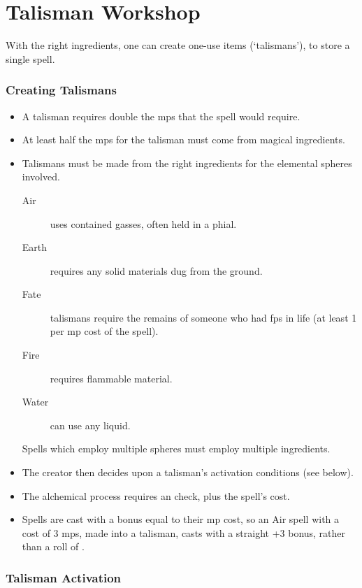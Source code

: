 \section{Talisman Workshop}

\begin{multicols}{2}

\noindent
With the right ingredients, one can create one-use items (`talismans'), to store a single spell.

\subsubsection{Creating Talismans}

\begin{itemize}
  \item
  A talisman requires double the \glspl{mp} that the spell would require.
  \item
  At least half the \glspl{mp} for the talisman must come from magical ingredients.
  \item
  Talismans must be made from the right ingredients for the elemental spheres involved.
  \begin{description}
    \item[Air]
    uses contained gasses, often held in a phial.
    \item[Earth]
    requires any solid materials dug from the ground.
    \item[Fate]
    talismans require the remains of someone who had \glspl{fp} in life (at least 1 per \gls{mp} cost of the spell).
    \item[Fire]
    requires flammable material.
    \item[Water]
    can use any liquid.
  \end{description}
  Spells which employ multiple spheres must employ multiple ingredients.
  \item
  The creator then decides upon a talisman's activation conditions (see below).
  \item
  The alchemical process requires an  check, \tn[7] plus the spell's cost.
  \item
  Spells are cast with a bonus equal to their \gls{mp} cost, so an Air spell with a cost of 3 \glspl{mp}, made into a talisman, casts with a straight +3 bonus, rather than a roll of .
\end{itemize}

\subsubsection{Talisman Activation}


\end{multicols}
